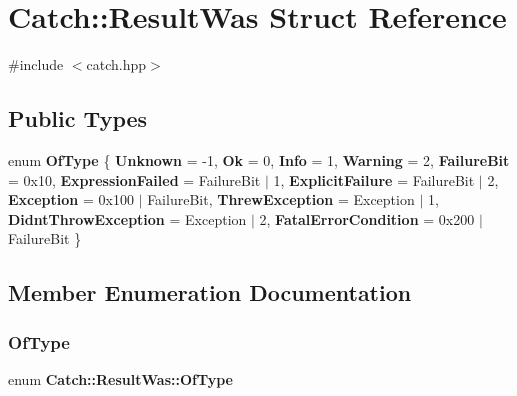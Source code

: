 \section{Catch\+::Result\+Was Struct Reference}
\label{struct_catch_1_1_result_was}


{\ttfamily \#include $<$catch.\+hpp$>$}

\subsection*{Public Types}
\begin{DoxyCompactItemize}
\item 
enum \textbf{ Of\+Type} \{ \newline
\textbf{ Unknown} = -\/1, 
\textbf{ Ok} = 0, 
\textbf{ Info} = 1, 
\textbf{ Warning} = 2, 
\newline
\textbf{ Failure\+Bit} = 0x10, 
\textbf{ Expression\+Failed} = Failure\+Bit $\vert$ 1, 
\textbf{ Explicit\+Failure} = Failure\+Bit $\vert$ 2, 
\textbf{ Exception} = 0x100 $\vert$ Failure\+Bit, 
\newline
\textbf{ Threw\+Exception} = Exception $\vert$ 1, 
\textbf{ Didnt\+Throw\+Exception} = Exception $\vert$ 2, 
\textbf{ Fatal\+Error\+Condition} = 0x200 $\vert$ Failure\+Bit
 \}
\end{DoxyCompactItemize}


\subsection{Member Enumeration Documentation}
\mbox{\label{struct_catch_1_1_result_was_a624e1ee3661fcf6094ceef1f654601ef}} 
\subsubsection{OfType}
{\footnotesize\ttfamily enum \textbf{ Catch\+::\+Result\+Was\+::\+Of\+Type}}

